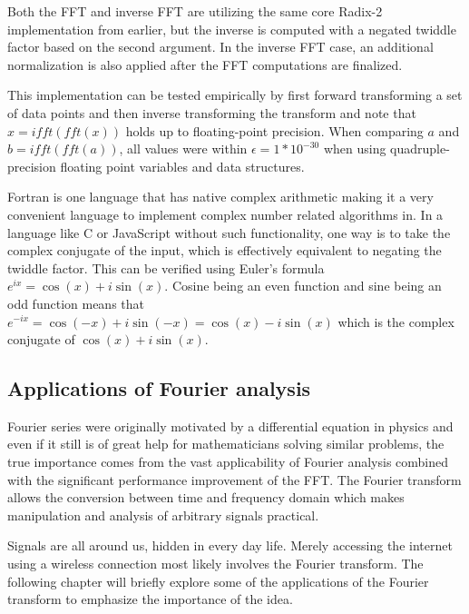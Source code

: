 

Both the FFT and inverse FFT are utilizing the same core Radix-2 implementation from earlier, but the inverse is computed with a negated twiddle factor based on the second argument. In the inverse FFT case, an additional normalization is also applied after the FFT computations are finalized.

This implementation can be tested empirically by first forward transforming a set of data points and then inverse transforming the transform and note that $x = ifft(fft(x))$ holds up to floating-point precision. When comparing $a$ and $b = ifft(fft(a))$, all values were within $\epsilon = 1*10^{-30}$ when using quadruple-precision floating point variables and data structures.

Fortran is one language that has native complex arithmetic making it a very convenient language to implement complex number related algorithms in. In a language like C or JavaScript without such functionality, one way is to take the complex conjugate of the input, which is effectively equivalent to negating the twiddle factor. This can be verified using Euler's formula $e^{ix} = \cos(x) + i\sin(x)$. Cosine being an even function and sine being an odd function means that $e^{-ix} = \cos(-x) + i\sin(-x) = \cos(x) - i\sin(x)$ which is the complex conjugate of $\cos(x) + i\sin(x)$. 

\subsection{Applications of Fourier analysis}
Fourier series were originally motivated by a differential equation in physics and even if it still is of great help for mathematicians solving similar problems, the true importance comes from the vast applicability of Fourier analysis combined with the significant performance improvement of the FFT. The Fourier transform allows the conversion between time and frequency domain which makes manipulation and analysis of arbitrary signals practical. 

Signals are all around us, hidden in every day life. Merely accessing the internet using a wireless connection most likely involves the Fourier transform. The following chapter will briefly explore some of the applications of the Fourier transform to emphasize the importance of the idea. 


